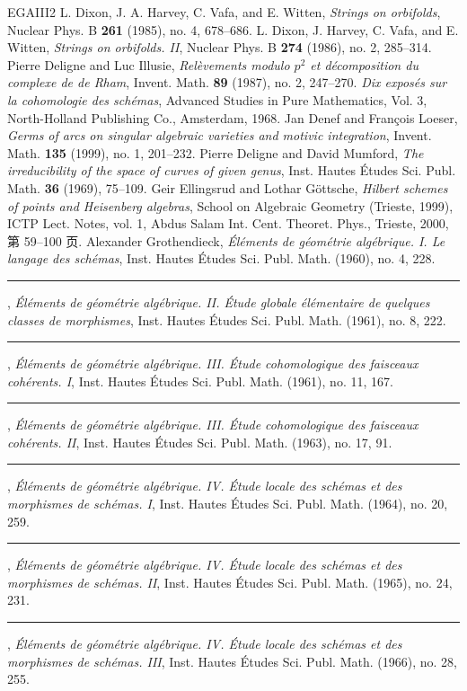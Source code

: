 \begin{thebibliography}{EGAIII2}
 L. Dixon, J. A. Harvey, C. Vafa, and E. Witten, \emph{Strings on orbifolds}, Nuclear Phys. B \textbf{261} (1985), no. 4, 678--686.
 L. Dixon, J. Harvey, C. Vafa, and E. Witten, \emph{Strings on orbifolds. II}, Nuclear Phys. B \textbf{274} (1986), no. 2, 285--314.
 Pierre Deligne and Luc Illusie, \emph{Relèvements modulo $p^2$ et décomposition du complexe de de Rham}, Invent. Math. \textbf{89} (1987), no. 2, 247--270.
 \emph{Dix exposés sur la cohomologie des schémas}, Advanced Studies in Pure Mathematics, Vol. 3, North-Holland Publishing Co., Amsterdam, 1968.
 Jan Denef and François Loeser, \emph{Germs of arcs on singular algebraic varieties and motivic integration}, Invent. Math. \textbf{135} (1999), no. 1, 201--232.
 Pierre Deligne and David Mumford, \emph{The irreducibility of the space of curves of given genus}, Inst. Hautes Études Sci. Publ. Math. \textbf{36} (1969), 75--109.
 Geir Ellingsrud and Lothar Göttsche, \emph{Hilbert schemes of points and Heisenberg algebras}, School on Algebraic Geometry (Trieste, 1999), ICTP Lect. Notes, vol. 1, Abdus Salam Int. Cent. Theoret. Phys., Trieste, 2000, 第 59--100 页.
 Alexander Grothendieck, \emph{Éléments de géométrie algébrique. I. Le langage des schémas}, Inst. Hautes Études Sci. Publ. Math. (1960), no. 4, 228.
 \rule{2em}{.3pt}, \emph{Éléments de géométrie algébrique. II. Étude globale élémentaire de quelques classes de morphismes}, Inst. Hautes Études Sci. Publ. Math. (1961), no. 8, 222.
 \rule{2em}{.3pt}, \emph{Éléments de géométrie algébrique. III. Étude cohomologique des faisceaux cohérents. I}, Inst. Hautes Études Sci. Publ. Math. (1961), no. 11, 167.
 \rule{2em}{.3pt}, \emph{Éléments de géométrie algébrique. III. Étude cohomologique des faisceaux cohérents. II}, Inst. Hautes Études Sci. Publ. Math. (1963), no. 17, 91.
 \rule{2em}{.3pt}, \emph{Éléments de géométrie algébrique. IV. Étude locale des schémas et des morphismes de schémas. I}, Inst. Hautes Études Sci. Publ. Math. (1964), no. 20, 259.
 \rule{2em}{.3pt}, \emph{Éléments de géométrie algébrique. IV. Étude locale des schémas et des morphismes de schémas. II}, Inst. Hautes Études Sci. Publ. Math. (1965), no. 24, 231.
 \rule{2em}{.3pt}, \emph{Éléments de géométrie algébrique. IV. Étude locale des schémas et des morphismes de schémas. III}, Inst. Hautes Études Sci. Publ. Math. (1966), no. 28, 255.

\end{thebibliography}
